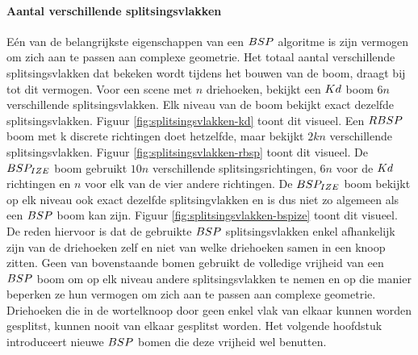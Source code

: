   \paragraph{Aantal verschillende splitsingsvlakken}
  Eén van de belangrijkste eigenschappen van een $BSP$ algoritme is zijn vermogen om zich aan te passen aan complexe geometrie.
  Het totaal aantal verschillende splitsingsvlakken dat bekeken wordt tijdens het bouwen van de boom, draagt bij tot dit vermogen.
  Voor een scene met $n$ driehoeken, bekijkt een $Kd$ boom $6n$ verschillende splitsingsvlakken. 
  Elk niveau van de boom bekijkt exact dezelfde splitsingsvlakken. Figuur \ref{fig:splitsingsvlakken-kd} toont dit visueel.
  Een $RBSP$ boom met k discrete richtingen doet hetzelfde, maar bekijkt $2kn$ verschillende splitsingsvlakken. 
  Figuur \ref{fig:splitsingsvlakken-rbsp} toont dit visueel.
  De $BSP_{IZE}$ boom gebruikt $10n$ verschillende splitsingsrichtingen, $6n$ voor de $Kd$ richtingen en $n$ voor elk van de vier andere richtingen.
  De $BSP_{IZE}$ boom bekijkt op elk niveau ook exact dezelfde splitsingvlakken en is dus niet zo algemeen als een $BSP$ boom kan zijn. 
  Figuur \ref{fig:splitsingsvlakken-bspize} toont dit visueel.
  De reden hiervoor is dat de gebruikte $BSP$ splitsingsvlakken enkel afhankelijk zijn van de driehoeken zelf en niet van welke driehoeken samen in een knoop zitten.
  Geen van bovenstaande bomen gebruikt de volledige vrijheid van een $BSP$ boom om op elk niveau andere splitsingsvlakken te nemen en op die manier beperken ze hun vermogen om zich aan te passen aan complexe geometrie.
  Driehoeken die in de wortelknoop door geen enkel vlak van elkaar kunnen worden gesplitst, kunnen nooit van elkaar gesplitst worden.
  Het volgende hoofdstuk introduceert nieuwe $BSP$ bomen die deze vrijheid wel benutten.
  
